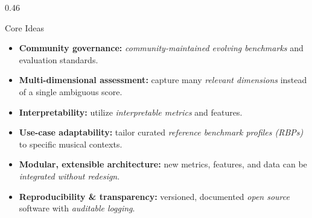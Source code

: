 \documentclass{beamer}
\begin{document}
\begin{frame}[t]
\begin{columns}[t]
\begin{column}{0.46\paperwidth}
      \begin{block}{Core Ideas}
        \begin{itemize}
          \bigskip
          \item \textbf{Community governance:} \textit{community-maintained evolving benchmarks} and evaluation standards.
          \bigskip
          \item \textbf{Multi-dimensional assessment:} capture many \textit{relevant dimensions} instead of a single ambiguous score.
          \bigskip
          \item \textbf{Interpretability:} utilize \textit{interpretable metrics} and features.
          \bigskip
          \item \textbf{Use-case adaptability:} tailor curated \textit{reference benchmark profiles (RBPs)} to specific musical contexts.
           \bigskip
          \item \textbf{Modular, extensible architecture:} new metrics, features, and data can be \textit{integrated without redesign}.
          \bigskip
          \item \textbf{Reproducibility \& transparency:} versioned, documented \textit{open source} software with \textit{auditable logging}.
        \end{itemize}


\end{block}
\end{column}
\end{columns}
\end{frame}
\end{document}
